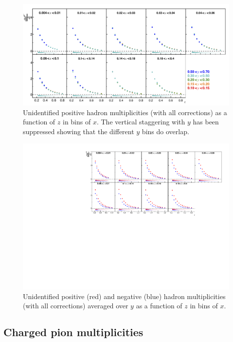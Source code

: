 \begin{figure}[!h]
  \centering
	\includegraphics[scale=0.85]{./gfx/hnoystag.png}
	\caption{Unidentified positive hadron multiplicities (with all corrections) as a function of $z$ in bins of $x$. The vertical staggering with $y$ has been suppressed showing that the different $y$ bins do overlap.}
	\label{pic:mhnoy}
\end{figure}

\begin{figure}[!h]
  \centering
	\includegraphics[scale=0.85]{./gfx/hyavg.pdf}
	\caption{Unidentified positive (red) and negative (blue) hadron multiplicities (with all corrections) averaged over $y$ as a function of $z$ in bins of $x$.}
	\label{pic:mhyavg}
\end{figure}

\newpage

\subsection{Charged pion multiplicities}

